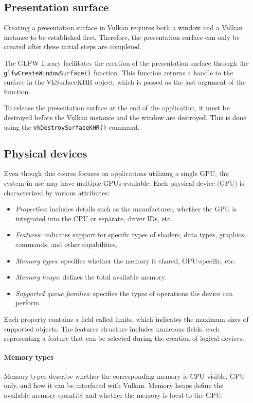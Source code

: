 \subsection{Presentation surface}
Creating a presentation surface in Vulkan requires both a window and a Vulkan instance to be established first. 
Therefore, the presentation surface can only be created after these initial steps are completed.

The GLFW library facilitates the creation of the presentation surface through the \texttt{glfwCreateWindowSurface()} function. 
This function returns a handle to the surface in the VkSurfaceKHR object, which is passed as the last argument of the function.

To release the presentation surface at the end of the application, it must be destroyed before the Vulkan instance and the window are destroyed. 
This is done using the \texttt{vkDestroySurfaceKHR()} command.

\subsection{Physical devices}
Even though this course focuses on applications utilizing a single GPU, the system in use may have multiple GPUs available. Each physical device (GPU) is characterized by various attributes:
\begin{itemize}
    \item \textit{Properties}: includes details such as the manufacturer, whether the GPU is integrated into the CPU or separate, driver IDs, etc.
    \item \textit{Features}: indicates support for specific types of shaders, data types, graphics commands, and other capabilities.
    \item \textit{Memory types}: specifies whether the memory is shared, GPU-specific, etc.
    \item \textit{Memory heaps}: defines the total available memory.
    \item \textit{Supported queue families}: specifies the types of operations the device can perform.
\end{itemize}
Each property contains a field called limits, which indicates the maximum sizes of supported objects. 
The features structure includes numerous fields, each representing a feature that can be selected during the creation of logical devices.

\paragraph*{Memory types}
Memory types describe whether the corresponding memory is CPU-visible, GPU-only, and how it can be interfaced with Vulkan. 
Memory heaps define the available memory quantity and whether the memory is local to the GPU.

